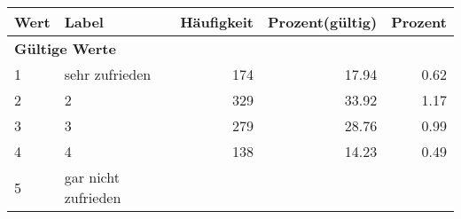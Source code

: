      \begin{longtable}{lXrrr}
     \toprule
     \textbf{Wert} & \textbf{Label} & \textbf{Häufigkeit} & \textbf{Prozent(gültig)} & \textbf{Prozent} \\
     \endhead
     \midrule
     \multicolumn{5}{l}{\textbf{Gültige Werte}}\\

     1 &
     \multicolumn{1}{X}{ sehr zufrieden   } &


       \num{174} &
       \num[round-mode=places,round-precision=2]{17,94} &
         \num[round-mode=places,round-precision=2]{0,62} \\

     2 &
     \multicolumn{1}{X}{ 2   } &


       \num{329} &
       \num[round-mode=places,round-precision=2]{33,92} &
         \num[round-mode=places,round-precision=2]{1,17} \\

     3 &
     \multicolumn{1}{X}{ 3   } &


       \num{279} &
       \num[round-mode=places,round-precision=2]{28,76} &
         \num[round-mode=places,round-precision=2]{0,99} \\

     4 &
     \multicolumn{1}{X}{ 4   } &


       \num{138} &
       \num[round-mode=places,round-precision=2]{14,23} &
         \num[round-mode=places,round-precision=2]{0,49} \\

     5 &
     \multicolumn{1}{X}{ gar nicht zufrieden   } &



\end{longtable}
